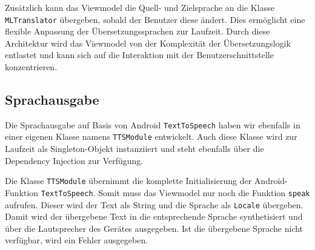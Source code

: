 Zusätzlich kann das Viewmodel die Quell- und Zielsprache an die Klasse \texttt{MLTranslator} übergeben, sobald der Benutzer diese ändert. Dies ermöglicht eine flexible Anpassung der Übersetzungssprachen zur Laufzeit. Durch diese Architektur wird das Viewmodel von der Komplexität der Übersetzungslogik entlastet und kann sich auf die Interaktion mit der Benutzerschnittstelle konzentrieren.

\subsection{Sprachausgabe}
Die Sprachausgabe auf Basis von Android \texttt{TextToSpeech} haben wir ebenfalls in einer eigenen Klasse namens \texttt{TTSModule} entwickelt. Auch diese Klasse wird zur Laufzeit als Singleton-Objekt instanziiert und steht ebenfalls über die Dependency Injection zur Verfügung.

Die Klasse \texttt{TTSModule} übernimmt die komplette Initialisierung der Android-Funktion \texttt{TextToSpeech}. Somit muss das Viewmodel nur noch die Funktion \texttt{speak} aufrufen. Dieser wird der Text als String und die Sprache als \texttt{Locale} übergeben. Damit wird der übergebene Text in die entsprechende Sprache synthetisiert und über die Lautsprecher des Gerätes ausgegeben. Ist die übergebene Sprache nicht verfügbar, wird ein Fehler ausgegeben.